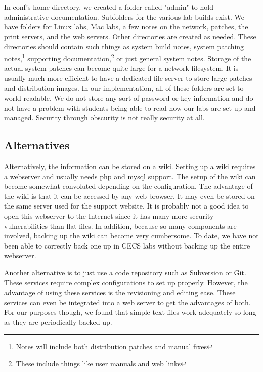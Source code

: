 In conf's home directory, we created a folder called "admin" to hold administrative documentation.  Subfolders for the various lab builds exist.  We have folders for Linux labs, Mac labs, a few notes on the network, patches, the print servers, and the web servers.  Other directories are created as needed.  These directories should contain such things as system build notes, system patching notes,\footnote{Notes will include both distribution patches and manual fixes} supporting documentation,\footnote{These include things like user manuals and web links} or just general system notes.  Storage of the actual system patches can become quite large for a network filesystem.  It is usually much more efficient to have a dedicated file server to store large patches and distribution images.  In our implementation, all of these folders are set to world readable.  We do not store any sort of password or key information and do not have a problem with students being able to read how our labs are set up and managed.  Security through obscurity is not really security at all.  

\subsection{Alternatives}

Alternatively, the information can be stored on a wiki.  Setting up a wiki requires a webserver and usually needs php and mysql support.  The setup of the wiki can become somewhat convoluted depending on the configuration.  The advantage of the wiki is that it can be accessed by any web browser.  It may even be stored on the same server used for the support website.  It is probably not a good idea to open this webserver to the Internet since it has many more security vulnerabilities than flat files.  In addition, because so many components are involved, backing up the wiki can become very cumbersome.  To date, we have not been able to correctly back one up in CECS labs without backing up the entire webserver.  

Another alternative is to just use a code repository such as Subversion or Git.  These services require complex configurations to set up properly.  However, the advantage of using these services is the revisioning and editing ease.  These services can even be integrated into a web server to get the advantages of both.  For our purposes though, we found that simple text files work adequately so long as they are periodically backed up.  
